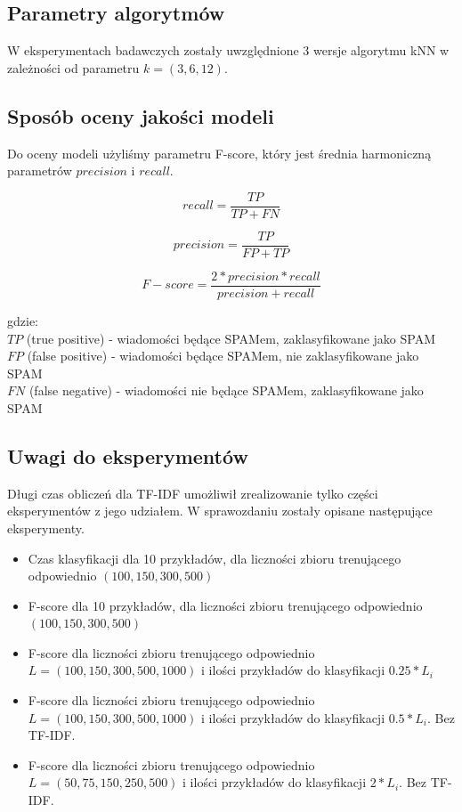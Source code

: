 \documentclass[a4paper, 10pt]{article}
\begin{document}
	
	\subsection{Parametry algorytmów}
W eksperymentach badawczych zostały uwzględnione 3 wersje algorytmu kNN w zależności od parametru $k=(3,6,12)$.


	\subsection{Sposób oceny jakości modeli}
	
	Do oceny modeli użyliśmy parametru F-score, który jest średnia harmoniczną parametrów $precision$ i $recall$.
	
	
\begin{equation}
recall = \frac{TP}{TP + FN}
\end{equation}

\begin{equation}
precision = \frac{TP}{FP + TP}
\end{equation}

\begin{equation}
{F-score} = \frac{2*precision*recall}{precision + recall}
\end{equation}


gdzie:\\
$TP$ (true positive) - wiadomości będące SPAMem, zaklasyfikowane jako SPAM\\
$FP$ (false positive) - wiadomości będące SPAMem, nie zaklasyfikowane jako SPAM\\
$FN$ (false negative) - wiadomości nie będące SPAMem, zaklasyfikowane jako SPAM\\

	


\subsection{Uwagi do eksperymentów}

Długi czas obliczeń dla TF-IDF umożliwił zrealizowanie tylko części eksperymentów z jego udziałem.
W sprawozdaniu zostały opisane następujące eksperymenty.

\begin{itemize}
  \item Czas klasyfikacji dla 10 przykładów, dla liczności zbioru trenującego odpowiednio $(100,150,300,500)$
  \item F-score dla 10 przykładów, dla liczności zbioru trenującego odpowiednio $(100,150,300,500)$
  \item F-score dla liczności zbioru trenującego odpowiednio $L=(100,150,300,500,1000)$ i ilości przykładów do klasyfikacji $0.25*L_i$
  \item F-score dla liczności zbioru trenującego odpowiednio $L=(100,150,300,500,1000)$ i ilości przykładów do klasyfikacji $0.5*L_i$. Bez TF-IDF.
  \item F-score dla liczności zbioru trenującego odpowiednio $L=(50,75,150,250,500)$ i ilości przykładów do klasyfikacji $2*L_i$. Bez TF-IDF.
\end{itemize}
\end{document}
